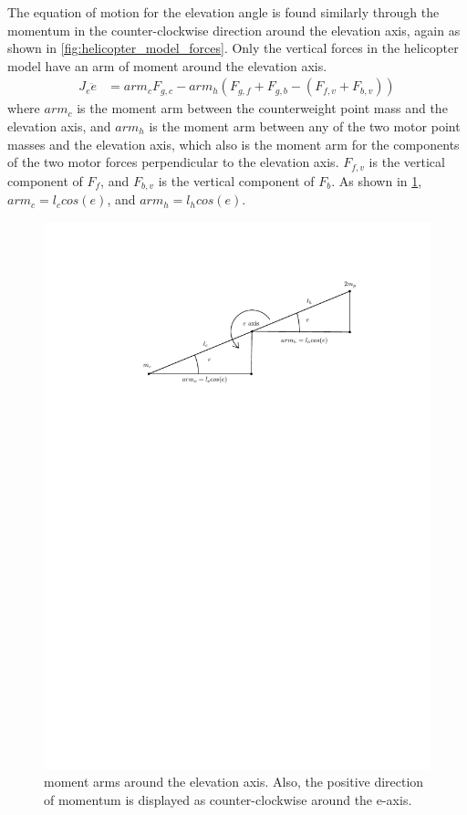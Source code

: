 The equation of motion for the elevation angle is found similarly through the momentum in the counter-clockwise direction around the elevation axis, again as shown in \cref{fig:helicopter_model_forces}. Only the vertical forces in the helicopter model have an arm of moment around the elevation axis.
\begin{align*}
  J_e\ddot{e} &= arm_cF_{g,c} - arm_h(F_{g,f}+F_{g,b} - (F_{f,v} + F_{b,v}))
\end{align*}
where $arm_c$ is the moment arm between the counterweight point mass
and the elevation axis, and $arm_h$ is the moment arm between any of
the two motor point masses and the elevation axis, which also is the moment arm for the components of the two motor forces perpendicular to the elevation axis. $F_{f,v}$ is the vertical component of $F_f$, and $F_{b,v}$ is the vertical component of $F_b$. As shown in \cref{fig:elevation_model}, $arm_c = l_ccos(e)$, and $arm_h = l_hcos(e)$.
\begin{figure}[H]
  \caption{moment arms around the elevation axis. Also, the positive direction of momentum is displayed as counter-clockwise around the e-axis.}
  \label{fig:elevation_model}
  \includegraphics[width=1\textwidth]{images/elevation_model}
\end{figure}
